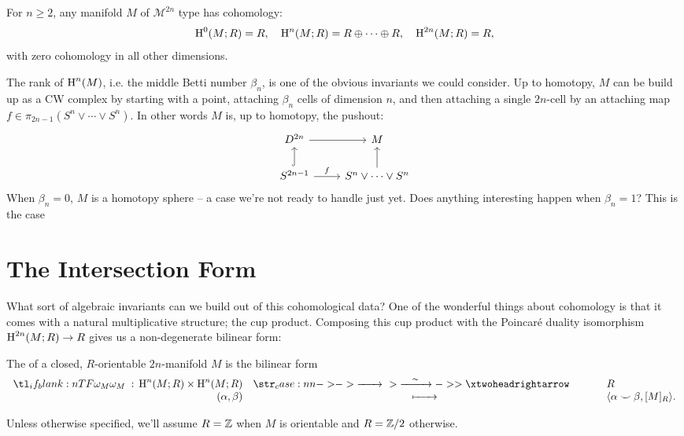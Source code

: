 \begin{proposition}
	For $n\geq 2$, any manifold $M$ of $\mathscr{M}^{2n}$ type has cohomology:
	\[
		\operatorname{H}^0(M; R) = R,\quad \operatorname{H}^n(M; R) = R\oplus \cdots \oplus R,\quad \operatorname{H}^{2n}(M; R)=R,
	\]
	with zero cohomology in all other dimensions.
\end{proposition}

The rank of $\operatorname{H}^n(M)$, i.e. the middle Betti number $\beta_n$, is one of the obvious invariants we could consider. Up to homotopy, $M$ can be build up as a CW complex by starting with a point, attaching $\beta_n$ cells of dimension $n$, and then attaching a single $2n$-cell by an attaching map $f \in \pi_{2n-1}(S^n\vee \cdots \vee S^n)$. In other words $M$ is, up to homotopy, the pushout:
\[\begin{tikzcd}
		{D^{2n}} & M \\
		{S^{2n-1}} & {S^n \vee \cdots \vee S^n}
		\arrow[from=1-1, to=1-2]
		\arrow[hook, from=2-1, to=1-1]
		\arrow["f", from=2-1, to=2-2]
		\arrow[from=2-2, to=1-2]
	\end{tikzcd}\]
When $\beta_n=0$, $M$ is a homotopy sphere -- a case we're not ready to handle just yet. Does anything interesting happen when $\beta_n=1$? This is the case


\section{The Intersection Form}


What sort of algebraic invariants can we build out of this cohomological data? One of the wonderful things about cohomology is that it comes with a natural multiplicative structure; the cup product. Composing this cup product with the Poincar\'e duality isomorphism $\operatorname{H}^{2n}(M; R) \to R$ gives us a non-degenerate bilinear form:
\begin{definition}\label{def:intersection-form}
	The  of a closed, $R$-orientable $2n$-manifold $M$ is the bilinear form
	\[
		\lkxfunc{\omega_M}{\H^n(M;R)\times \H^n(M; R)}{R}{(\alpha,\beta)}{\langle\alpha\smile\beta, [M]_R\rangle.}
	\]
\end{definition}
\begin{note*}
	Unless otherwise specified, we'll assume $R=\mathbb{Z}$ when $M$ is orientable and $R=\mathbb{Z}/2$ otherwise.
\end{note*}

